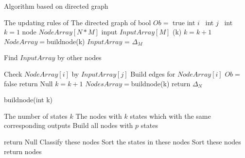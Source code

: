 \begin{algorithm}[h]
\caption{Algorithm based on directed graph}
\begin{algorithmic}[1]
\REQUIRE 
The updating rules of \BCN
\ENSURE  
The directed graph of \BCN
\STATE bool $Ob=$ true %
\STATE int $i$ \
\STATE int $j$ \
\STATE int $k=1$ %
\STATE node $NodeArray[N*M]$
\STATE input $InputArray[M]$
\STATE {\sf buildnode}(k)
\STATE $k= k+1$
\STATE $NodeArray=${\sf buildnode}(k)
\IF{($k==2$)}
\STATE $InputArray$ = $\Delta_M$ 
\ELSE

\STATE Find $InputArray$ by other nodes

\ENDIF
\STATE Check $NodeArray[i]$ by $InputArray[j]$ 
\STATE Build edges for $NodeArray[i]$ 
\ENDFOR
{}
\STATE  $Ob=$ false 
\STATE return Null
\ENDIF
\ENDFOR
\STATE $k= k+1$
\STATE $NodesArray=${\sf buildnode}(k)
\ENDWHILE
\STATE return $\Delta_N$\
\end{algorithmic}
 \label{alg:1}
\end{algorithm}
\begin{algorithm}[h!]
\caption{{\sf buildnode}(int k)}
\begin{algorithmic}[1]
\REQUIRE 
The number of states $k$
\ENSURE  
The nodes with $k$ states which with the same corresponding outputs %
\STATE  Build all nodes with $p$ states %

\STATE  return Null
\ELSE 
\STATE  Classify these nodes
\STATE Sort the states in these nodes
\STATE Sort these nodes%
\STATE return nodes
\ENDIF 
\end{algorithmic}
 \label{alg:2}
\end{algorithm}


